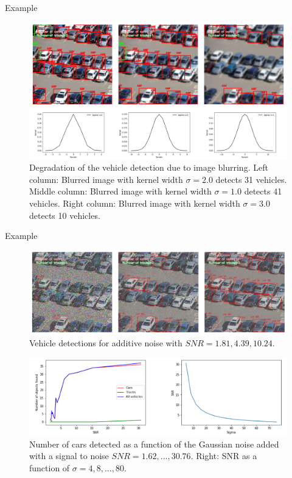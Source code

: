 \documentclass{libs/ufc_format}
\begin{document}
\begin{frame}{Example}
    \begin{figure}
        \centering
        \includegraphics[scale=0.2]{libs/blureffect.png}
        \vspace{0.4cm}
        \caption{Degradation of the vehicle detection due to image blurring. Left column: Blurred image with kernel width $\sigma=2.0$ detects 31 vehicles. Middle column: Blurred image with kernel width $\sigma=1.0$ detects 41 vehicles. Right column: Blurred image with kernel width $\sigma=3.0$ detects 10 vehicles.}
        \label{fig:challenge}
    \end{figure}

\end{frame}

\begin{frame}{Example}
    \begin{figure}
        \centering
        \includegraphics[scale=0.15]{libs/noiseeffect.png}
        \caption{Vehicle detections for additive noise with $SNR = {1.81, 4.39, 10.24}$.}
        \label{fig:challengenoise}
    \end{figure}
    
    \begin{figure}
        \centering
        \includegraphics[scale=0.2]{libs/noiseeffect2.png}
        \caption{Number of cars detected as a function of the Gaussian noise added with a signal to noise $SNR = {1.62,..., 30.76}$. Right: SNR as a function of $\sigma = {4, 8,..., 80}$.}
        \label{fig:challengenoise2}
    \end{figure}

\end{frame}
\end{document}
